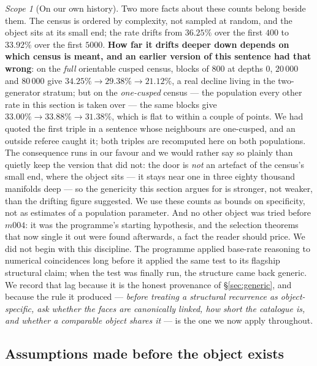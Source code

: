 \documentclass[11pt,a4paper]{article}
\theoremstyle{definition}
\theoremstyle{remark}
\newtheorem{scopenote}{Scope}
\begin{document}
\begin{scopenote}[On our own history]
Two more facts about these counts belong beside them. The census is ordered by complexity, not sampled at random, and the object sits at its small end; the rate drifts from $36.25\%$ over the first $400$ to $33.92\%$ over the first $5000$. \textbf{How far it drifts deeper down depends on which census is meant, and an earlier version of this sentence had that wrong}: on the \emph{full} orientable cusped census, blocks of $800$ at depths $0$, $20\,000$ and $80\,000$ give
$34.25\% \to 29.38\% \to 21.12\%$, a real decline living in the two-generator stratum; but on the \emph{one-cusped}
census --- the population every other rate in this section is taken over --- the same blocks give
$33.00\% \to 33.88\% \to 31.38\%$, which is flat to within a couple of points. We had quoted the first triple in a
sentence whose neighbours are one-cusped, and an outside referee caught it; both triples are recomputed here on both
populations. The consequence runs in our favour and we would rather say so plainly than quietly keep the version that
did not: the door is \emph{not} an artefact of the census's small end, where the object sits --- it stays near one in
three eighty thousand manifolds deep --- so the genericity this section argues for is stronger, not weaker, than the
drifting figure suggested. We use these counts as bounds on specificity, not as estimates of a population parameter. And no other object was tried before $m004$: it was the programme's starting hypothesis, and the selection theorems that now single it out were found afterwards, a fact the reader should price. We did not begin with this discipline. The programme applied base-rate reasoning to numerical
coincidences long before it applied the same test to its flagship structural claim; when the test
was finally run, the structure came back generic. We record that lag because it is the honest
provenance of \S\ref{sec:generic}, and because the rule it produced --- \emph{before treating a
structural recurrence as object-specific, ask whether the faces are canonically linked, how short the
catalogue is, and whether a comparable object shares it} --- is the one we now apply throughout.
\end{scopenote}

\subsection{Assumptions made before the object exists}\label{sec:axioms}
\end{document}
